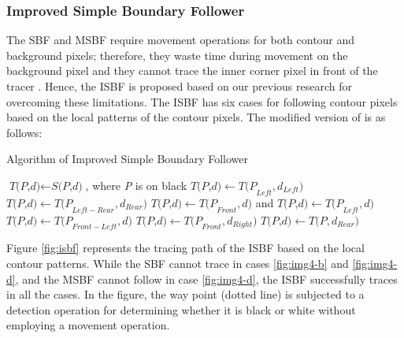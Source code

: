 \subsubsection{Improved Simple Boundary Follower}

The SBF and MSBF require movement operations for both contour and background pixels; therefore, they waste time during movement on the background pixel and they cannot trace the inner corner pixel in front of the tracer \cite{Cheong2006Improved,Toussaint????Grids}. Hence, the ISBF \cite{Cheong2006Improved} is proposed based on our previous research for overcoming these limitations. The ISBF has six cases for following contour pixels based on the local patterns of the contour pixels. The modified version of \cite{Cheong2006Advanced} is as follows: 

\begin{algorithm}
	\caption{Algorithm of Improved Simple Boundary Follower}\label{alg:isbf}
	\begin{algorithmic}[1]
	\State $\textit{T(P,d)} \gets \textit{S(P,d)}$, where \textit{P} is on black
	\Do
		\State $\textit{T(P,d)} \gets \textit{T(P}_{Left},\textit{d}_{Left} )  $
	\Else
			\State $\textit{T(P,d)} \gets \textit{T(P}_{Left-Rear},\textit{d}_{Rear} )  $
		\Else
					\State $\textit{T(P,d)} \gets \textit{T(P}_{Front},\textit{d} )  $ and $\textit{T(P,d)} \gets \textit{T(P}_{Left}, \textit{d})$
				\Else
					\State $\textit{T(P,d)} \gets \textit{T(P}_{Front-Left},\textit{d} )  $
				\EndIf
				\State $\textit{T(P,d)} \gets \textit{T(P}_{Front},\textit{d}_{Right} )  $
			\Else
				\State $\textit{T(P,d)} \gets \textit{T(P},\textit{d}_{Rear} )  $
			\EndIf
		\EndIf
	\EndIf
	\EndProcedure
	\end{algorithmic}
\end{algorithm}

Figure \ref{fig:isbf} represents the tracing path of the ISBF based on the local contour patterns. While the SBF cannot trace in cases \ref{fig:img4-b} and \ref{fig:img4-d}, and the MSBF cannot follow in case \ref{fig:img4-d}, the ISBF successfully traces in all the cases. In the figure, the way point (dotted line) is subjected to a detection operation for determining whether it is black or white without employing a movement operation.

